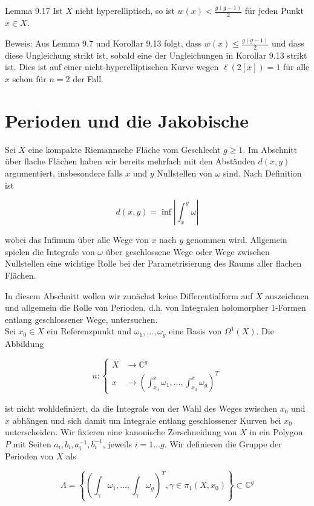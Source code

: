 \documentclass[10pt, letterpaper]{article}
\begin{document}
Lemma 9.17 Ist $X$ nicht hyperelliptisch, so ist $w(x)<\frac{g(g-1)}{2}$ für jeden Punkt $x \in X$.

Beweis: Aus Lemma 9.7 und Korollar 9.13 folgt, dass $w(x) \leq \frac{g(g-1)}{2}$ und dass diese Ungleichung strikt ist, sobald eine der Ungleichungen in Korollar 9.13 strikt ist. Dies ist auf einer nicht-hyperelliptischen Kurve wegen $\ell(2[x])=1$ für alle $x$ schon für $n=2$ der Fall.

\section {Perioden und die Jakobische}
Sei $X$ eine kompakte Riemannsche Fläche vom Geschlecht $g \geqslant 1$. Im Abschnitt über flache Flächen haben wir bereits mehrfach mit den Abständen $d(x, y)$ argumentiert, insbesondere falls $x$ und $y$ Nullstellen von $\omega$ sind. Nach Definition ist

$$
d(x, y)=\inf \left|\int_{x}^{y} \omega\right|
$$

wobei das Infimum über alle Wege von $x$ nach $y$ genommen wird. Allgemein spielen die Integrale von $\omega$ über geschlossene Wege oder Wege zwischen Nullstellen eine wichtige Rolle bei der Parametrisierung des Raums aller flachen Flächen.

In diesem Abschnitt wollen wir zunächst keine Differentialform auf $X$ auszeichnen und allgemein die Rolle von Perioden, d.h. von Integralen holomorpher 1-Formen entlang geschlossener Wege, untersuchen.\\
Sei $x_{0} \in X$ ein Referenzpunkt und $\omega_{1}, \ldots, \omega_{g}$ eine Basis von $\Omega^{1}(X)$. Die Abbildung

$$
u:\left\{\begin{aligned}
X & \longrightarrow \mathbb{C}^{g} \\
x & \longrightarrow\left(\int_{x_{0}}^{x} \omega_{1}, \ldots, \int_{x_{0}}^{x} \omega_{g}\right)^{T}
\end{aligned}\right.
$$

ist nicht wohldefiniert, da die Integrale von der Wahl des Weges zwischen $x_{0}$ und $x$ abhängen und sich damit um Integrale entlang geschlossener Kurven bei $x_{0}$ unterscheiden. Wir fixieren eine kanonische Zerschneidung von $X$ in ein Polygon $P$ mit Seiten $a_{i}, b_{i}, a_{i}^{-1}, b_{i}^{-1}$, jeweils $i=1 \ldots g$. Wir definieren die Gruppe der Perioden von $X$ als

$$
\Lambda=\left\{\left(\int_{\gamma} \omega_{1}, \ldots, \int_{\gamma} \omega_{g}\right)^{T}, \gamma \in \pi_{1}\left(X, x_{0}\right)\right\} \subset \mathbb{C}^{g}
$$
\end{document}

